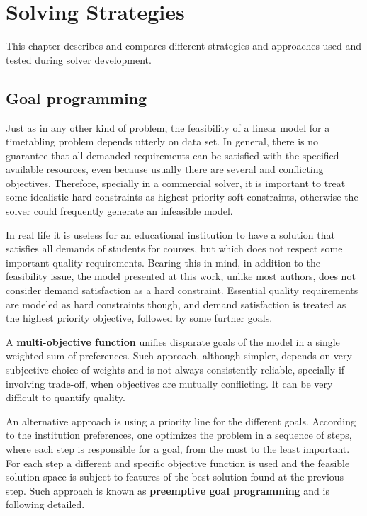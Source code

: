 \chapter{Solving Strategies}
\label{chap:strategies}

This chapter describes and compares different strategies and approaches used and tested during solver development.


\section{Goal programming}

Just as in any other kind of problem, the feasibility of a linear model for a timetabling problem depends utterly on data set. In general, there is no guarantee that all demanded requirements can be satisfied with the specified available resources, even because usually there are several and conflicting objectives. Therefore, specially in a commercial solver, it is important to treat some idealistic hard constraints as highest priority soft constraints, otherwise the solver could frequently generate an infeasible model.

In real life it is useless for an educational institution to have a solution that satisfies all demands of students for courses, but which does not respect some important quality requirements. Bearing this in mind, in addition to the feasibility issue, the model presented at this work, unlike most authors, does not consider demand satisfaction as a hard constraint. Essential quality requirements are modeled as hard constraints though, and demand satisfaction is treated as the highest priority objective, followed by some further goals.

A \textbf{multi-objective function} unifies disparate goals of the model in a single weighted sum of preferences. Such approach, although simpler, depends on very subjective choice of weights and is not always consistently reliable, specially if involving trade-off, when objectives are mutually conflicting. It can be very difficult to quantify quality.

An alternative approach is using a priority line for the different goals. According to the institution preferences, one optimizes the problem in a sequence of steps, where each step is responsible for a goal, from the most to the least important. For each step a different and specific objective function is used and the feasible solution space is subject to features of the best solution found at the previous step. Such approach is known as \textbf{preemptive goal programming} and is following detailed.


